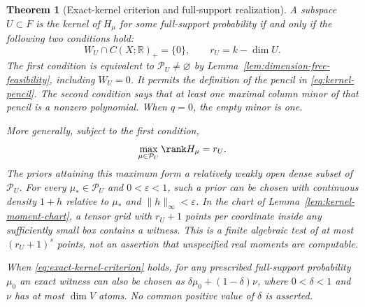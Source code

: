 \documentclass[11pt]{amsart}
\newtheorem{theorem}{Theorem}[section]
\theoremstyle{definition}\newtheorem{definition}[theorem]{Definition}
\theoremstyle{remark}\newtheorem{remark}[theorem]{Remark}
\newcommand{\R}{\mathbb R}\newcommand{\N}{\mathbb N}\newcommand{\C}{\mathbb C}
\begin{document}
\begin{theorem}[Exact-kernel criterion and full-support realization]
\label{thm:exact-kernel}
A subspace $U\subset F$ is the kernel of $H_\mu$ for some full-support
probability if and only if the following two conditions hold:
\begin{equation}\label{eq:exact-kernel-criterion}
 W_U\cap C(X;\R)_+=\{0\},\qquad r_U=k-\dim U.
\end{equation}
The first condition is equivalent to $\mathcal P_U\ne\varnothing$
by Lemma~\ref{lem:dimension-free-feasibility}, including $W_U=0$.
It permits the definition of the pencil in \eqref{eq:kernel-pencil}. The second condition says that at
least one maximal column minor of that pencil is a nonzero polynomial.
When $q=0$, the empty minor is one.

More generally, subject to the first condition,
\begin{equation}\label{eq:kernel-slice-max-rank}
 \max_{\mu\in\mathcal P_U}\rank H_\mu=r_U.
\end{equation}
The priors attaining this maximum form a relatively weakly open dense
subset of $\mathcal P_U$. For every $\mu_*\in\mathcal P_U$ and
$0<\varepsilon<1$, such a prior can be chosen with continuous density
$1+h$ relative to $\mu_*$ and $\|h\|_\infty<\varepsilon$.
In the chart of Lemma~\ref{lem:kernel-moment-chart}, a tensor grid with
$r_U+1$ points per coordinate inside any sufficiently small box contains
a witness. This is a finite algebraic test of at most $(r_U+1)^s$
points, not an assertion that unspecified real moments are computable.

When \eqref{eq:exact-kernel-criterion} holds, for any prescribed
full-support probability $\mu_0$ an exact witness can also be chosen as
$\delta\mu_0+(1-\delta)\nu$, where $0<\delta<1$ and $\nu$ has at
most $\dim V$ atoms. No common positive value of $\delta$ is asserted.
\end{theorem}
\end{document}
